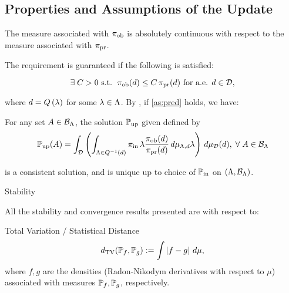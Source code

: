 \subsection{Properties and Assumptions of the Update}
\begin{frame}[t]
\begin{assumption}\label{as:pred}
	The measure associated with $\operatorname*{\pi_{ob}}$ is absolutely continuous with respect to the measure associated with $\operatorname*{\pi_{pr}}$.
\end{assumption}


The requirement is guaranteed if the following is satisfied:

\begin{equation}\label{eq:pred}
	\exists \; C>0 \text{ s.t. } \operatorname*{\pi_{ob}} (d) \leq C \operatorname*{\pi_{pr}} (d) \text{ for a.e. } d\in \mathcal{D},
\end{equation}

where $d = Q\left ( \lambda \right )$ for some $\lambda \in {\Lambda}$.
By \cite{BJW18}, if \eqref{as:pred} holds, we have: 

\begin{theorem}
	For any set $A\in \mathcal{B}_{{\Lambda}}$, the solution $\operatorname*{\mathbb{P}_{up}}$ given defined by
	\begin{equation}\label{eq:cb_sol}
		\operatorname*{\mathbb{P}_{up}} (A) = \int_{\mathcal{D}} \left (  \int_{{\Lambda} \in Q^{-1}(d)}  \operatorname*{\pi_{in}}\lambda \frac{\operatorname*{\pi_{ob}}(d)}{\operatorname*{\pi_{pr}}(d)} \, d\mu_{{\Lambda}, d} \lambda \right ) \, d\mu_{\mathcal{D}}(d), \; \forall \; A \in \mathcal{B}_{{\Lambda}}
	\end{equation}

	is a consistent solution, and is unique up to choice of $\operatorname*{\mathbb{P}_{in}}$ on $({\Lambda}, \mathcal{B}_{{\Lambda}})$.
\end{theorem}

\end{frame}


\begin{frame}[t]{Stability}

All the stability and convergence results presented are with respect to:
\vspace{0.5in}

\begin{defn}{Total Variation / Statistical Distance}
	\begin{equation}\label{eq:tv}
		d_{\text{TV}} (\mathbb{P}_f, \mathbb{P}_g) := \int \left\vert f - g\right\vert \, d\mu,
	\end{equation}
where $f,g$ are the densities (Radon-Nikodym derivatives with respect to $\mu$) associated with measures $\mathbb{P}_f, \mathbb{P}_g$, respectively.
\end{defn}

\end{frame}

